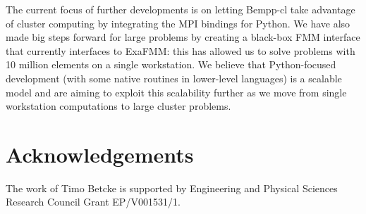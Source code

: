 \documentclass{IEEEcsmag}
\begin{document}
The current focus of further developments is on letting Bempp-cl take advantage of cluster computing by integrating the  MPI bindings for Python. We have also made big steps forward for large problems by creating a black-box FMM interface that currently interfaces to ExaFMM: this has allowed us to solve problems with 10 million elements on a single workstation. We believe that Python-focused development (with some native routines in lower-level languages) is a scalable model and are aiming to exploit this scalability further as we move from single workstation computations to large cluster problems.

\section{Acknowledgements}
The work of Timo Betcke is supported by Engineering and Physical Sciences Research Council Grant EP/V001531/1.
\end{document}

